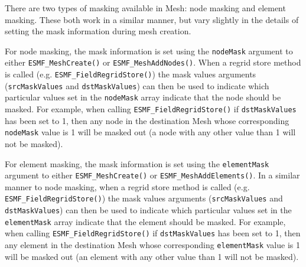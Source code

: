    There are two types of masking available in Mesh: node masking and element masking. These both work
   in a similar manner, but vary slightly in the details of setting the mask information during mesh creation. 
  
   For node masking, the mask information is set using the {\tt nodeMask} argument to either {\tt ESMF\_MeshCreate()} or 
   {\tt ESMF\_MeshAddNodes()}. When a regrid store method is called (e.g. {\tt ESMF\_FieldRegridStore()}) the mask values arguments 
   ({\tt srcMaskValues} and {\tt dstMaskValues}) can 
   then be used to indicate which particular values set in the {\tt nodeMask} array indicate that the node should be masked. For example, when 
   calling {\tt ESMF\_FieldRegridStore()} if {\tt dstMaskValues} has been set to 1, then any node in the destination Mesh whose 
   corresponding {\tt nodeMask} value is 1 will be masked out (a node with any other value than 1 will not be masked). 
  
   For element masking, the mask information is set using the {\tt elementMask} argument to either {\tt ESMF\_MeshCreate()} or 
   {\tt ESMF\_MeshAddElements()}. In a similar manner to node masking, when a regrid store method is called (e.g. {\tt ESMF\_FieldRegridStore()}) 
   the mask values arguments 
   ({\tt srcMaskValues} and {\tt dstMaskValues}) can 
   then be used to indicate which particular values set in the {\tt elementMask} array indicate that the element should be masked. For example, when 
   calling {\tt ESMF\_FieldRegridStore()} if {\tt dstMaskValues} has been set to 1, then any element in the destination Mesh whose 
   corresponding {\tt elementMask} value is 1 will be masked out (an element with any other value than 1 will not be masked). 
   

